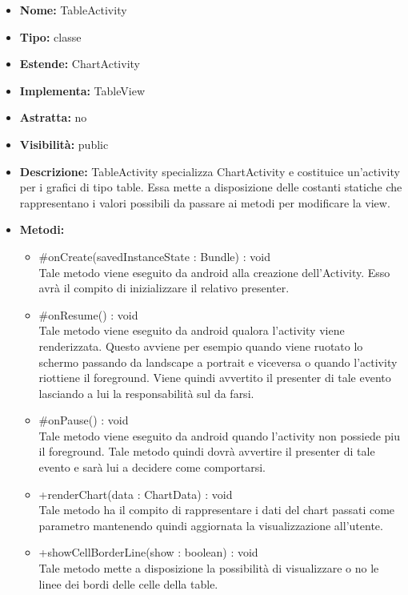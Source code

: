 			
			\begin{itemize}
			\item \textbf{Nome:} TableActivity
			\item \textbf{Tipo:} classe
			
		\item \textbf{Estende:}
		ChartActivity
		\item \textbf{Implementa:}
		TableView
		\item \textbf{Astratta:}
		no
			\item \textbf{Visibilità:} public
			\item \textbf{Descrizione:} TableActivity specializza ChartActivity e costituice un'activity per i grafici di tipo table. Essa mette a disposizione delle costanti statiche che rappresentano i valori possibili da passare ai metodi per modificare la view.
			\item \textbf{Metodi:}
				\begin{itemize}
				\setlength{\itemsep}{5pt}
				
					\item[\ding{111}] {{\#onCreate(savedInstanceState : Bundle) : void}} \\ [1mm] Tale metodo viene eseguito da android alla creazione dell'Activity. Esso avrà il compito di inizializzare il relativo presenter. 
					\item[\ding{111}] {{\#onResume() : void}} \\ [1mm] Tale metodo viene eseguito da android qualora l'activity viene renderizzata. Questo avviene per esempio quando viene ruotato lo schermo passando da landscape a portrait e viceversa o quando l'activity riottiene il foreground. Viene quindi avvertito il presenter di tale evento lasciando a lui la responsabilità sul da farsi.
					\item[\ding{111}] {{\#onPause() : void}} \\ [1mm] Tale metodo viene eseguito da android quando l'activity non possiede piu il foreground. Tale metodo quindi dovrà avvertire il presenter di tale evento e sarà lui a decidere come comportarsi.
					\item[\ding{111}] {{+renderChart(data : ChartData) : void}} \\ [1mm] Tale metodo ha il compito di rappresentare i dati del chart passati come parametro mantenendo quindi aggiornata la visualizzazione all'utente.
					\item[\ding{111}] {{+showCellBorderLine(show : boolean) : void}} \\ [1mm] Tale metodo mette a disposizione la possibilità di visualizzare o no le linee dei bordi delle celle della table.
				\end{itemize}
		
			\end{itemize}

